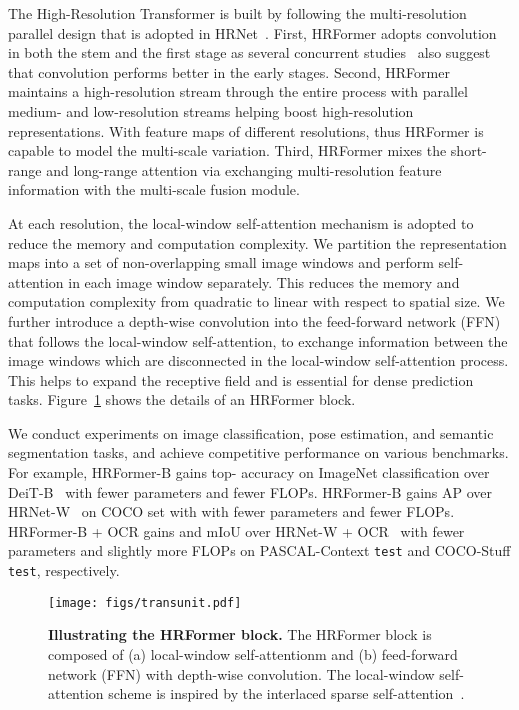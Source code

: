 \documentclass{article}
\begin{document}
The High-Resolution Transformer is built
by following the multi-resolution parallel design
that is adopted in HRNet~\cite{WangSCJDZLMTWLX19}.
First, HRFormer adopts convolution in both the stem and the first stage
as several concurrent studies~\cite{dai2021coatnet,xiao2021early}
also suggest that convolution performs better in the early stages.
Second, HRFormer maintains a high-resolution stream
through the entire process with parallel medium- and low-resolution streams
helping boost high-resolution representations.
With feature maps of different resolutions,
thus HRFormer is capable to model the multi-scale variation.
Third, HRFormer mixes the short-range and long-range attention
via exchanging multi-resolution feature information
with the multi-scale fusion module.


At each resolution, the local-window self-attention mechanism is adopted to reduce the memory and computation complexity.
We partition the representation maps into
a set of non-overlapping small image windows
and perform self-attention in each image window separately.
This reduces the memory and computation complexity
from quadratic to linear
with respect to spatial size.
We further introduce a  depth-wise  convolution
into the feed-forward network (FFN) that follows the local-window self-attention,
to exchange information
between the image windows
which are disconnected in the local-window self-attention process.
This helps to expand the receptive field
and is essential for dense prediction tasks.
Figure~\ref{fig:HRFormer_block} shows the details of an HRFormer block.


We conduct experiments on image classification, pose estimation, and semantic segmentation tasks, and achieve competitive performance on various benchmarks.
For example,
HRFormer-B gains  top- accuracy on ImageNet classification
over DeiT-B~\cite{touvron2020deit} with  fewer parameters and  fewer FLOPs.
HRFormer-B gains  AP over HRNet-W~\cite{XLW19} on COCO  set with with  fewer parameters and  fewer FLOPs.
HRFormer-B + OCR gains  and  mIoU over HRNet-W + OCR~\cite{yuan2019object}
with  fewer parameters and slightly more FLOPs
on PASCAL-Context \texttt{test} and COCO-Stuff \texttt{test}, respectively.


\begin{figure}[t]
  \small
  \centering
  \texttt{[image: figs/transunit.pdf]}
  \caption{\small \textbf{Illustrating the HRFormer block.}
    The HRFormer block is composed of
    (a) local-window self-attentionm and (b) feed-forward network (FFN) with depth-wise convolution.
    The local-window self-attention scheme is inspired
    by the interlaced sparse self-attention~\cite{yuan2018ocnet,huang2019interlaced}.
  }
  \label{fig:HRFormer_block}
\end{figure}
\end{document}
